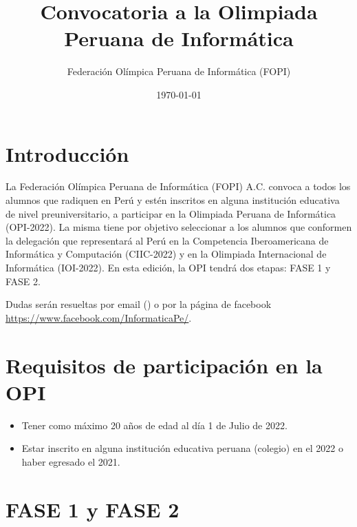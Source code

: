 \documentclass{article}
\title{Convocatoria a la Olimpiada Peruana de Informática
}
\author{Federación Olímpica Peruana de Informática (FOPI)}
\date{\today}
\begin{document}
\maketitle

\section{Introducción}

La Federación Olímpica Peruana de Informática (FOPI) A.C. convoca a todos los alumnos que radiquen en Perú y estén inscritos en alguna institución educativa de nivel preuniversitario, a participar en la Olimpiada Peruana de Informática (OPI-2022). La misma tiene por objetivo seleccionar a los alumnos que conformen la delegación que representará al Perú en la Competencia Iberoamericana de Informática y Computación (CIIC-2022) y en la Olimpiada Internacional de Informática (IOI-2022).
En esta edición, la OPI tendrá dos etapas: FASE 1 y FASE 2.

Dudas serán resueltas por email 
({\color{blue}{olimpiadaperuanainformatica@gmail.com})}
o por la página de facebook \url{https://www.facebook.com/InformaticaPe/}.


\section{Requisitos de participación en la OPI}

\begin{itemize}
    \item Tener como máximo 20 años de edad al día 1 de Julio de 2022.
    \item Estar inscrito en alguna institución educativa peruana (colegio) en el 2022 o haber egresado el 2021.
\end{itemize}



\section{FASE 1 y FASE 2}
\end{document}
